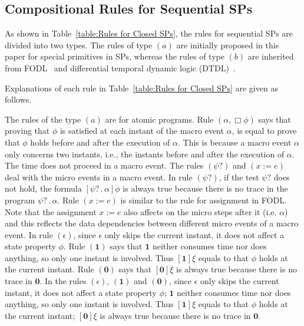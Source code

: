 \documentclass{fcs}
\newcommand{\noth}[0]{\mathbf{1}}
\newcommand{\halt}[0]{\mathbf{0}}
\DeclareMathOperator{\nex}{.}
\begin{document}
\subsection{Compositional Rules for Sequential SPs}
\label{section:Compositional Rules for Sequential SPs}

As shown in Table~\ref{table:Rules for Closed SPs}, the rules for sequential SPs are divided into two types.
The rules of type $(a)$ are initially proposed in this paper for special primitives in SPs, whereas the rules of type $(b)$ are inherited from FODL~\cite{Harel00} and differential temporal dynamic logic (DTDL)~\cite{Platzer07}.

Explanations of each rule in Table~\ref{table:Rules for Closed SPs} are given as follows.

The rules of the type $(a)$ are for atomic programs.
Rule $(\alpha, \Box\phi)$ says that proving that $\phi$ is satisfied at each instant of the macro event $\alpha$, is equal to prove that $\phi$ holds before and after the execution of $\alpha$.
This is because a macro event $\alpha$ only concerns two instants, i.e., the instants before and after the execution of $\alpha$. The time does not proceed in a macro event.
The rules $(\psi?)$ and $(x:=e)$ deal with the micro events in a macro event.
In rule $(\psi?)$, if the test $\psi?$ does not hold, the formula $[\psi?\nex \alpha]\phi$ is always true because there is no trace in the program $\psi?\nex \alpha$.
Rule $(x:=e)$ is similar to the rule for assignment in FODL. %
Note that the assignment $x:=e$ also affects on the micro steps after it (i.e. $\alpha$) and this reflects the data dependencies between different micro events of a macro event.
In rule $(\epsilon)$, %
since $\epsilon$ only skips the current instant, it does not affect a state property $\phi$.
Rule $(\noth)$ says that
$\noth$ neither consumes time nor does anything, so only one instant is involved. Thus $[\noth]\xi$ equals to that $\phi$ holds at the current instant.
Rule $(\halt)$ says that $[\halt]\xi$ is always true because there is no trace in $\halt$.
In the rules $(\epsilon)$, $(\noth)$ and $(\halt)$,
since $\epsilon$ only skips the current instant, it does not affect a state property $\phi$;
$\noth$ neither consumes time nor does anything, so only one instant is involved. Thus $[\noth]\xi$ equals to that $\phi$ holds at the current instant;
$[\halt]\xi$ is always true because there is no trace in $\halt$.
\fi
\end{document}

